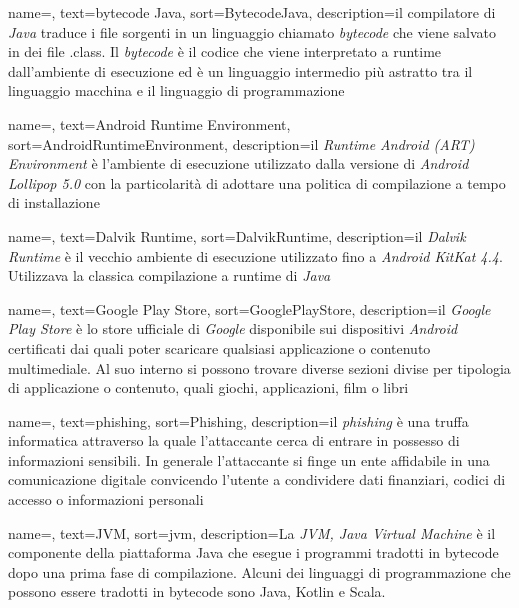 {
	name=,
	text=bytecode Java,
	sort=BytecodeJava,
	description={il compilatore di \emph{Java} traduce i file sorgenti in un linguaggio chiamato \emph{bytecode} che viene salvato in dei file .class. Il \emph{bytecode} è il codice che viene interpretato a runtime dall'ambiente di esecuzione ed è un linguaggio intermedio più astratto tra il linguaggio macchina e il linguaggio di programmazione }
}

{
	name=,
	text=Android Runtime Environment,
	sort=AndroidRuntimeEnvironment,
	description={il \emph{Runtime Android (ART) Environment} è l'ambiente di esecuzione utilizzato dalla versione di \emph{Android Lollipop 5.0} con la particolarità di adottare una politica di compilazione a tempo di installazione }
}

{
	name=,
	text=Dalvik Runtime,
	sort=DalvikRuntime,
	description={il \emph{Dalvik Runtime} è il vecchio ambiente di esecuzione utilizzato fino a \emph{Android KitKat 4.4}. Utilizzava la classica compilazione a runtime di \emph{Java} }
}

{
    name=,
    text=Google Play Store,
    sort=GooglePlayStore,
    description={il \emph{Google Play Store} è lo store ufficiale di \emph{Google} disponibile sui dispositivi \emph{Android} certificati dai quali poter scaricare qualsiasi applicazione o contenuto multimediale. Al suo interno si possono trovare diverse sezioni divise per tipologia di applicazione o contenuto, quali giochi, applicazioni, film o libri  }
}

{
	name=,
	text=phishing,
	sort=Phishing,
	description={il \emph{phishing} è una truffa informatica attraverso la quale l'attaccante cerca di entrare in possesso di informazioni sensibili. In generale l'attaccante si finge un ente affidabile in una comunicazione digitale convicendo l'utente a condividere dati finanziari, codici di accesso o informazioni personali }
}



{
	name=,
	text=JVM,
	sort=jvm,
	description={La \emph{JVM, Java Virtual Machine} è il componente della piattaforma Java che esegue i programmi tradotti in bytecode dopo una prima fase di compilazione. Alcuni dei linguaggi di programmazione che possono essere tradotti in bytecode sono Java, Kotlin e Scala.}
}


